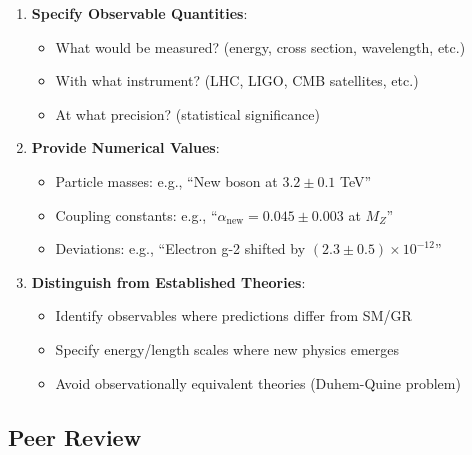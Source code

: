 \begin{enumerate}
    \item \textbf{Specify Observable Quantities}:
    \begin{itemize}
        \item What would be measured? (energy, cross section, wavelength, etc.)
        \item With what instrument? (LHC, LIGO, CMB satellites, etc.)
        \item At what precision? (statistical significance)
    \end{itemize}

    \item \textbf{Provide Numerical Values}:
    \begin{itemize}
        \item Particle masses: e.g., ``New boson at $3.2 \pm 0.1$ TeV''
        \item Coupling constants: e.g., ``$\alpha_{\text{new}} = 0.045 \pm 0.003$ at $M_Z$''
        \item Deviations: e.g., ``Electron g-2 shifted by $(2.3 \pm 0.5) \times 10^{-12}$''
    \end{itemize}

    \item \textbf{Distinguish from Established Theories}:
    \begin{itemize}
        \item Identify observables where predictions differ from SM/GR
        \item Specify energy/length scales where new physics emerges
        \item Avoid observationally equivalent theories (Duhem-Quine problem)
    \end{itemize}
\end{enumerate}

\subsection{Peer Review}

